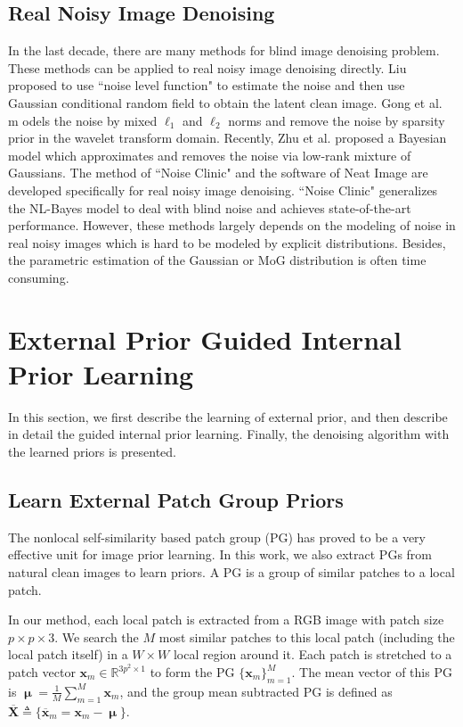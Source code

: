\documentclass[10pt,twocolumn,letterpaper]{article}
\begin{document}
\subsection{Real Noisy Image Denoising}

In the last decade, there are many methods \cite{Liu2008,almapg,noiseclinic,ncwebsite,Zhu_2016_CVPR,crosschannel2016} for blind image denoising problem. These methods can be applied to real noisy image denoising directly. Liu \etal \cite{Liu2008} proposed to use ``noise level function" to estimate the noise and then use Gaussian conditional random field to obtain the latent clean image. Gong et al. \cite{almapg} m odels the noise by mixed $\ell_{1}$ and $\ell_{2}$ norms and remove the noise by sparsity prior in the wavelet transform domain. Recently, Zhu et al. proposed a Bayesian model \cite{Zhu_2016_CVPR} which approximates and removes the noise via low-rank mixture of Gaussians. The method of ``Noise Clinic" \cite{noiseclinic,ncwebsite} and the software of Neat Image \cite{neatimage} are developed specifically for real noisy image denoising. ``Noise Clinic" \cite{noiseclinic,ncwebsite} generalizes the NL-Bayes model \cite{nlbayes} to deal with blind noise and achieves state-of-the-art performance. However, these methods largely depends on the modeling of noise in real noisy images which is hard to be modeled by explicit distributions. Besides, the parametric estimation of the Gaussian or MoG distribution is often time consuming. 

\section{External Prior Guided Internal Prior Learning}

In this section, we first describe the learning of external prior, and then describe in detail the guided internal prior learning. Finally, the denoising algorithm with the learned priors is presented.

\subsection{Learn External Patch Group Priors}

The nonlocal self-similarity based patch group (PG) \cite{pgpd} has proved to be a very effective unit for image prior learning. In this work, we also extract PGs from natural clean images to learn priors. A PG  is a group of similar patches to a local patch. 

In our method, each local patch is extracted from a RGB image with patch size $p\times p \times 3$. We search the $M$ most similar patches to this local patch (including the local patch itself) in a $W\times W$ local region around it. Each patch is stretched to a patch vector $\mathbf{x}_{m}\in \mathbb{R}^{3p^{2}\times1}$ to form the PG $\{\mathbf{x}_{m}\}_{m=1}^{M}$. The mean vector of this PG is $\boldsymbol{\upmu}=\frac{1}{M}\sum_{m=1}^{M}\mathbf{x}_{m}$, and the group mean subtracted PG is defined as $\mathbf{\overline{X}}\triangleq \{\mathbf{\overline{x}}_{m}=\mathbf{x}_{m}-\boldsymbol{\upmu}\}$.
\end{document}
